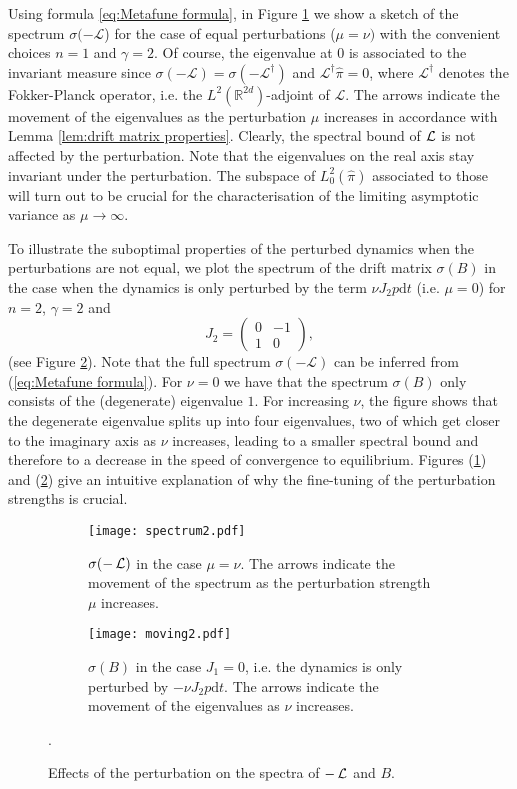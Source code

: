 Using formula \eqref{eq:Metafune formula}, in Figure \ref{fig:good_spectrum} we show a sketch of the spectrum $\sigma(-\mathcal{L}$)
for the case of equal perturbations ($\mu=\nu)$ with the convenient
choices $n=1$ and $\gamma=2.$ Of course, the eigenvalue at $0$ is
associated to the invariant measure since $\sigma(-\mathcal{L})=\sigma(-\mathcal{L}^{\dagger})$
and $\mathcal{L}^{\dagger}\widehat{\pi}=0$, where $\mathcal{L}^{\dagger}$ denotes the Fokker-Planck operator, i.e. the $L^2(\mathbb{R}^{2d})$-adjoint of $\mathcal{L}$. The arrows indicate the movement
of the eigenvalues as the perturbation $\mu$ increases in accordance
with Lemma \ref{lem:drift matrix properties}. Clearly, the spectral
bound of $\operatorname{\mathcal{L}}$ is not affected by the perturbation. 
Note that the eigenvalues on the real axis stay invariant under the
perturbation. The subspace of $L_{0}^{2}(\widehat{\pi})$ associated to
those will turn out to be crucial for the characterisation of the
limiting asymptotic variance as $\mu\rightarrow\infty$.

To illustrate the suboptimal properties of the perturbed dynamics
when the perturbations are not equal, we plot the spectrum of the
drift matrix $\sigma(B)$ in the case when the dynamics is only perturbed
by the term $\nu J_{2}p\mathrm{d}t$ (i.e. $\mu=0$) for $n=2$, $\gamma=2$ and
\begin{equation}
J_2=\left(\begin{array}{cc}
0 & -1\\
1 & 0
\end{array}\right),
\end{equation} 
(see Figure \ref{fig:bad_spectrum}). Note that the full spectrum $\sigma(-\mathcal{L})$
can be inferred from (\ref{eq:Metafune formula}). For $\nu=0$ we have that the spectrum $\sigma(B)$
only consists of the (degenerate) eigenvalue $1$. For increasing
$\nu$, the figure shows that the degenerate eigenvalue splits up
into four eigenvalues, two of which get closer to the imaginary axis as $\nu$ increases, leading to a smaller spectral
bound and therefore to a decrease in the speed of convergence to equilibrium.
Figures (\ref{fig:good_spectrum}) and (\ref{fig:bad_spectrum}) give an intuitive explanation
of why the fine-tuning of the perturbation strengths is crucial.

\begin{figure}
	\begin{subfigure}[b]{0.45 \textwidth}
		\texttt{[image: spectrum2.pdf]}
		\caption{$\sigma(-\operatorname{\mathcal{L}})$ in the case $\mu=\nu$. The arrows indicate the movement of the spectrum as the perturbation strength $\mu$ increases.\label{fig:good_spectrum}}
	\end{subfigure}
	\hfill
	\begin{subfigure}[b]{0.45 \textwidth}
		\texttt{[image: moving2.pdf]}
		\caption{$\sigma(B)$ in the case $J_{1}=0$, i.e. the dynamics is only perturbed
			by $-\nu J_{2}p\mathrm{d}t$. The arrows indicate the movement of
			the eigenvalues as $\nu$ increases.\label{fig:bad_spectrum}}
	\end{subfigure}
	.	\caption{Effects of the perturbation on the spectra of $-\operatorname{\mathcal{L}}$ and $B$.}
	\label{fig:examples-introduction}
\end{figure}

